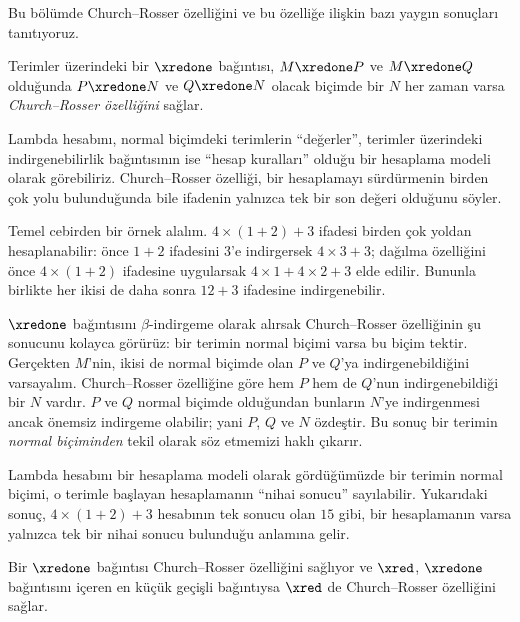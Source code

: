 



Bu bölümde Church--Rosser özelliğini ve bu özelliğe ilişkin bazı yaygın
sonuçları tanıtıyoruz.

\begin{defn} Terimler üzerindeki bir
  $\xredone$ bağıntısı, $M\xredone P$ ve $M\xredone Q$ olduğunda
  $P\xredone N$ ve $Q\xredone N$ olacak biçimde bir $N$ her zaman varsa
  \emph{Church--Rosser özelliğini} sağlar.
\end{defn}

Lambda hesabını, normal biçimdeki terimlerin ``değerler'', terimler
üzerindeki indirgenebilirlik bağıntısının ise ``hesap kuralları'' olduğu bir
hesaplama modeli olarak görebiliriz. Church--Rosser özelliği, bir hesaplamayı
sürdürmenin birden çok yolu bulunduğunda bile ifadenin yalnızca tek bir son
değeri olduğunu söyler.

Temel cebirden bir örnek alalım. $4\times(1+2)+3$ ifadesi birden çok yoldan
hesaplanabilir: önce $1+2$ ifadesini $3$'e indirgersek $4\times3+3$;
dağılma özelliğini önce $4\times(1+2)$ ifadesine uygularsak
$4\times1+4\times2+3$ elde edilir. Bununla birlikte her ikisi de daha sonra
$12+3$ ifadesine indirgenebilir.

$\xredone$ bağıntısını $\beta$-indirgeme olarak alırsak Church--Rosser
özelliğinin şu sonucunu kolayca görürüz: bir terimin normal biçimi varsa bu
biçim tektir. Gerçekten $M$'nin, ikisi de normal biçimde olan $P$ ve $Q$'ya
indirgenebildiğini varsayalım. Church--Rosser özelliğine göre hem $P$ hem de
$Q$'nun indirgenebildiği bir $N$ vardır. $P$ ve $Q$ normal biçimde olduğundan
bunların $N$'ye indirgenmesi ancak önemsiz indirgeme olabilir; yani $P$, $Q$
ve $N$ özdeştir. Bu sonuç bir terimin \emph{normal biçiminden} tekil olarak
söz etmemizi haklı çıkarır.

Lambda hesabını bir hesaplama modeli olarak gördüğümüzde bir terimin normal
biçimi, o terimle başlayan hesaplamanın ``nihai sonucu'' sayılabilir.
Yukarıdaki sonuç, $4\times(1+2)+3$ hesabının tek sonucu olan $15$ gibi, bir
hesaplamanın varsa yalnızca tek bir nihai sonucu bulunduğu anlamına gelir.

\begin{thm} 
  Bir $\xredone$ bağıntısı Church--Rosser özelliğini sağlıyor ve $\xred$,
  $\xredone$ bağıntısını içeren en küçük geçişli bağıntıysa $\xred$ de
  Church--Rosser özelliğini sağlar.
\end{thm}

